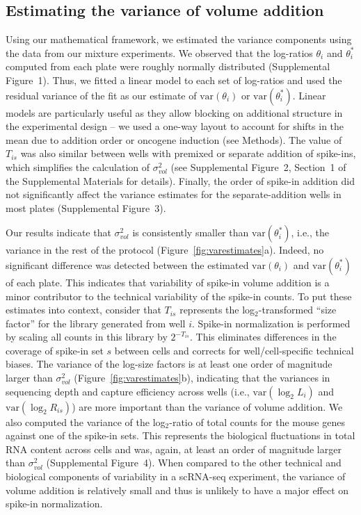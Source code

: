 \documentclass{article}
\newcommand{\suppfignorm}{1}
\newcommand{\suppfigtotals}{2}
\newcommand{\suppfigorder}{3}
\newcommand{\suppfigcell}{4}
\newcommand{\suppsecmath}{1}
\newcommand\variance{\mbox{var}}
\begin{document}
\subsection*{Estimating the variance of volume addition}
Using our mathematical framework, we estimated the variance components using the data from our mixture experiments.
We observed that the log-ratios $\theta_i$ and $\theta^*_i$ computed from each plate were roughly normally distributed (Supplemental Figure~\suppfignorm{}).
Thus, we fitted a linear model to each set of log-ratios and used the residual variance of the fit as our estimate of $\variance(\theta_i)$ or $\variance(\theta^*_i)$.
Linear models are particularly useful as they allow blocking on additional structure in the experimental design -- we used a one-way layout to account for shifts in the mean due to addition order or oncogene induction (see Methods).
The value of $T_{is}$ was also similar between wells with premixed or separate addition of spike-ins, which simplifies the calculation of $\sigma^2_{vol}$ (see Supplemental Figure~\suppfigtotals{}, Section~\suppsecmath{} of the Supplemental Materials for details).
Finally, the order of spike-in addition did not significantly affect the variance estimates for the separate-addition wells in most plates (Supplemental Figure~\suppfigorder{}).

Our results indicate that $\sigma^2_{vol}$ is consistently smaller than $\variance(\theta^*_i)$, i.e., the variance in the rest of the protocol (Figure~\ref{fig:varestimates}a).
Indeed, no significant difference was detected between the estimated $\variance(\theta_i)$ and $\variance(\theta^*_i)$ of each plate.
This indicates that variability of spike-in volume addition is a minor contributor to the technical variability of the spike-in counts.
To put these estimates into context, consider that $T_{is}$ represents the log$_2$-transformed ``size factor'' for the library generated from well $i$.
Spike-in normalization is performed by scaling all counts in this library by $2^{-T_{is}}$.
This eliminates differences in the coverage of spike-in set $s$ between cells and corrects for well/cell-specific technical biases.
The variance of the log-size factors is at least one order of magnitude larger than $\sigma^2_{vol}$ (Figure~\ref{fig:varestimates}b), indicating that the variances in sequencing depth and capture efficiency across wells (i.e., $\variance{(\log_2 L_{i})}$ and $\variance{(\log_2 R_{is})}$) are more important than the variance of volume addition.
We also computed the variance of the log$_2$-ratio of total counts for the mouse genes against one of the spike-in sets.
This represents the biological fluctuations in total RNA content across cells and was, again, at least an order of magnitude larger than $\sigma^2_{vol}$ (Supplemental Figure~\suppfigcell{}).
When compared to the other technical and biological components of variability in a scRNA-seq experiment, the variance of volume addition is relatively small and thus is unlikely to have a major effect on spike-in normalization.
\end{document}
